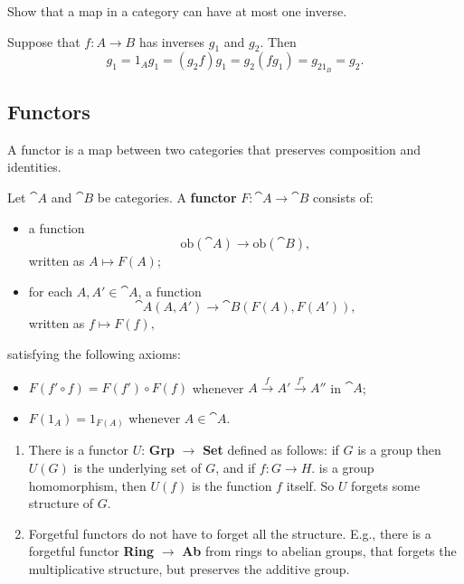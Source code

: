\documentclass[11pt,a4paper]{article}
\begin{document}
\begin{exercise}
    Show that a map in a category can have at most one inverse.
\end{exercise}
\begin{solution}
    Suppose that $f: A\to B$ has inverses $g_1$ and $g_2$. Then
    $$g_1 = 1_Ag_1 = (g_2f)g_1 = g_2(fg_1) = g_21_B = g_2.$$
\end{solution}

\subsection{Functors}
A functor is a map between two categories that preserves composition and identities.
\begin{definition}
    Let $\cat{A}$ and $\cat{B}$ be categories. A \textbf{functor} $F: \cat{A}\to \cat{B}$ consists of:
    \begin{itemize}
        \item a function
            $$\text{ob}(\cat{A})\to \text{ob}(\cat{B}),$$
            written as $A\mapsto F(A)$;
        \item for each $A,A'\in \cat{A}$, a function
            $$\cat{A}(A,A')\to \cat{B}(F(A),F(A')),$$
            written as $f\mapsto F(f),$
    \end{itemize}
    satisfying the following axioms:
    \begin{itemize}
        \item $F(f'\circ f)=F(f')\circ F(f)$ whenever $A\xrightarrow{f}A'\xrightarrow{f'}A''$ in $\cat{A}$;
        \item $F(1_A) = 1_{F(A)}$ whenever $A\in \cat{A}$.
    \end{itemize}
\end{definition}

\begin{example}\leavevmode
    \begin{enumerate}[label=(\alph*)]
        \item There is a functor $U$: \textbf{Grp} $\to$ \textbf{Set} defined as follows: if $G$ is a group then $U(G)$ is the underlying set of $G$, and if $f:G\to H$. is a group homomorphism, then $U(f)$ is the function $f$ itself. So $U$ forgets some structure of $G$.
        \item Forgetful functors do not have to forget all the structure. E.g., there is a forgetful functor \textbf{Ring} $\to$ \textbf{Ab}  from rings to abelian groups, that forgets the multiplicative structure, but preserves the additive group.
    \end{enumerate}
\end{example}
\end{document}

